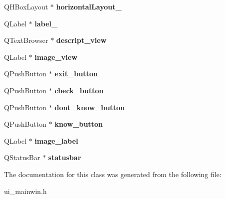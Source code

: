 \begin{DoxyCompactItemize}
\item 
\mbox{\label{class_ui___main_win_a19ebcde7bcc6691b579c698fd814f3fb}} 
Q\+H\+Box\+Layout $\ast$ {\bfseries horizontal\+Layout\+\_}
\item 
\mbox{\label{class_ui___main_win_aa2c8358d98375295c8f56ced24847203}} 
Q\+Label $\ast$ {\bfseries label\+\_}
\item 
\mbox{\label{class_ui___main_win_ae7bef2876407ebff1d4347bc599355a7}} 
Q\+Text\+Browser $\ast$ {\bfseries descript\+\_\+view}
\item 
\mbox{\label{class_ui___main_win_a6ebcef6787f8220daf8798b6e370af1c}} 
Q\+Label $\ast$ {\bfseries image\+\_\+view}
\item 
\mbox{\label{class_ui___main_win_a1730737dfeb3b54b3d653183f582137e}} 
Q\+Push\+Button $\ast$ {\bfseries exit\+\_\+button}
\item 
\mbox{\label{class_ui___main_win_a02d94095c3d351f63857a9ea83beaf20}} 
Q\+Push\+Button $\ast$ {\bfseries check\+\_\+button}
\item 
\mbox{\label{class_ui___main_win_aaa22ec024c399b8c7a539789d72bf6ce}} 
Q\+Push\+Button $\ast$ {\bfseries dont\+\_\+know\+\_\+button}
\item 
\mbox{\label{class_ui___main_win_a44eaafe353a42058df2fa5cf3a1faacc}} 
Q\+Push\+Button $\ast$ {\bfseries know\+\_\+button}
\item 
\mbox{\label{class_ui___main_win_a68785e2d3a0379ad5dd01cc1192b18b0}} 
Q\+Label $\ast$ {\bfseries image\+\_\+label}
\item 
\mbox{\label{class_ui___main_win_a1177632545f78597de242758668f6152}} 
Q\+Status\+Bar $\ast$ {\bfseries statusbar}
\end{DoxyCompactItemize}


The documentation for this class was generated from the following file\+:\begin{DoxyCompactItemize}
\item 
ui\+\_\+mainwin.\+h\end{DoxyCompactItemize}
